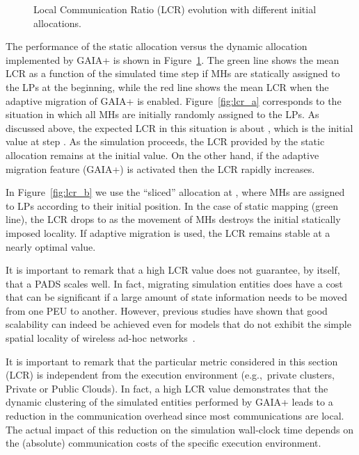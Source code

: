 \documentclass[1p]{elsarticle}
\begin{document}
\begin{figure}[ht]
\centering
{}
\caption{Local Communication Ratio (LCR) evolution with different
  initial allocations.}
\label{fig:lcr}
\end{figure}

The performance of the static allocation versus the dynamic allocation
implemented by GAIA+ is shown in Figure~\ref{fig:lcr}. The green line
shows the mean LCR as a function of the simulated time step if MHs are
statically assigned to the LPs at the beginning, while the red line
shows the mean LCR when the adaptive migration of GAIA+ is
enabled. Figure~\ref{fig:lcr_a} corresponds to the situation in which
all MHs are initially randomly assigned to the LPs. As discussed
above, the expected LCR in this situation is about , which is
the initial value at step . As the simulation proceeds, the LCR
provided by the static allocation remains at the initial value.  On
the other hand, if the adaptive migration feature (GAIA+) is activated
then the LCR rapidly increases.

In Figure~\ref{fig:lcr_b} we use the ``sliced'' allocation at ,
where MHs are assigned to LPs according to their initial position.  In
the case of static mapping (green line), the LCR drops to  as
the movement of MHs destroys the initial statically imposed
locality. If adaptive migration is used, the LCR remains stable at a
nearly optimal value.

It is important to remark that a high LCR value does not guarantee, by
itself, that a PADS scales well. In fact, migrating simulation
entities does have a cost that can be significant if a large amount of
state information needs to be moved from one PEU to another. However,
previous studies have shown that good scalability can indeed be
achieved even for models that do not exhibit the simple spatial
locality of wireless ad-hoc networks~\cite{gda-mospas-11}.

It is important to remark that the particular metric considered in
this section (LCR) is independent from the execution environment
(e.g.,~private clusters, Private or Public Clouds). In fact, a high
LCR value demonstrates that the dynamic clustering of the simulated
entities performed by GAIA+ leads to a reduction in the communication
overhead since most communications are local. The actual impact of
this reduction on the simulation wall-clock time depends on the
(absolute) communication costs of the specific execution environment.
\end{document}
